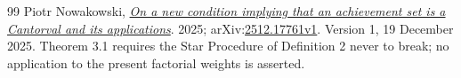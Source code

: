 \documentclass[11pt]{article}
\begin{document}
\begin{thebibliography}{99}
 Piotr Nowakowski, \href{https://arxiv.org/abs/2512.17761v1}{\emph{On a new condition implying that an achievement set is a Cantorval and its applications}}.
  2025; arXiv:\href{https://arxiv.org/abs/2512.17761v1}{2512.17761v1}. Version 1, 19 December 2025. Theorem 3.1 requires the Star Procedure of Definition 2 never to break; no application to the present factorial weights is asserted.
\end{thebibliography}

\companionpapercontext
\end{document}

